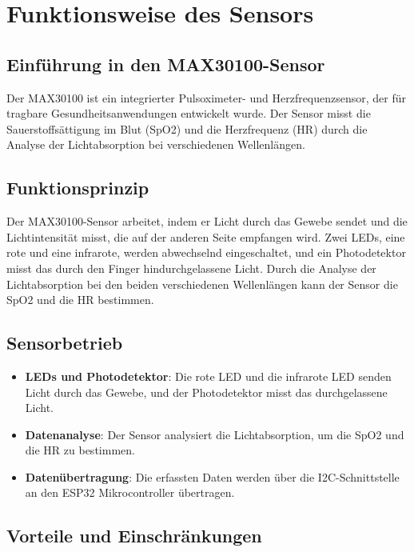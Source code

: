\documentclass[conference,a4paper,flushend]{cs-techrep}
\begin{document}
\section{Funktionsweise des Sensors}

\subsection{Einführung in den MAX30100-Sensor}

Der MAX30100 ist ein integrierter Pulsoximeter- und Herzfrequenzsensor, der für tragbare Gesundheitsanwendungen entwickelt wurde. Der Sensor misst die Sauerstoffsättigung im Blut (SpO2) und die Herzfrequenz (HR) durch die Analyse der Lichtabsorption bei verschiedenen Wellenlängen.

\subsection{Funktionsprinzip}

Der MAX30100-Sensor arbeitet, indem er Licht durch das Gewebe sendet und die Lichtintensität misst, die auf der anderen Seite empfangen wird. Zwei LEDs, eine rote und eine infrarote, werden abwechselnd eingeschaltet, und ein Photodetektor misst das durch den Finger hindurchgelassene Licht. Durch die Analyse der Lichtabsorption bei den beiden verschiedenen Wellenlängen kann der Sensor die SpO2 und die HR bestimmen.

\subsection{Sensorbetrieb}

\begin{itemize}
    \item \textbf{LEDs und Photodetektor}: Die rote LED und die infrarote LED senden Licht durch das Gewebe, und der Photodetektor misst das durchgelassene Licht.
    \vspace{0.5em}
    \item \textbf{Datenanalyse}: Der Sensor analysiert die Lichtabsorption, um die SpO2 und die HR zu bestimmen.
    \vspace{0.5em}
    \item \textbf{Datenübertragung}: Die erfassten Daten werden über die I2C-Schnittstelle an den ESP32 Mikrocontroller übertragen.
\end{itemize}

\subsection{Vorteile und Einschränkungen}
\end{document}
